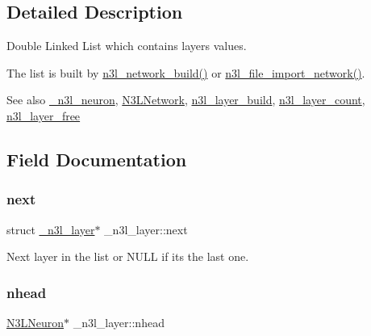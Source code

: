 \subsection{Detailed Description}
Double Linked List which contains layer\textquotesingle{}s values. 

The list is built by \hyperlink{n3__network_8c_a5f87e1efebd658dd55d7d2ca1768bdba}{n3l\+\_\+network\+\_\+build()} or \hyperlink{n3__file_8c_a4fef76548ed87845dceafaa9527a83d0}{n3l\+\_\+file\+\_\+import\+\_\+network()}.

\begin{DoxySeeAlso}{See also}
\hyperlink{struct__n3l__neuron}{\+\_\+n3l\+\_\+neuron}, \hyperlink{structN3LNetwork}{N3\+L\+Network}, \hyperlink{n3__layer_8c_a135215adb7cf8420293fd4ebd7049655}{n3l\+\_\+layer\+\_\+build}, \hyperlink{n3__layer_8c_ab06afb58d55be21a00bde5ee840f6425}{n3l\+\_\+layer\+\_\+count}, \hyperlink{n3__layer_8c_ad58e1630c1b7fc5da03d54cf63c394d9}{n3l\+\_\+layer\+\_\+free} 
\end{DoxySeeAlso}


\subsection{Field Documentation}
\mbox{\label{struct__n3l__layer_afada0fe8b2a403d5aeeb71b0ae7f8aae}} 
\subsubsection{\texorpdfstring{next}{next}}
{\footnotesize\ttfamily struct \hyperlink{struct__n3l__layer}{\+\_\+n3l\+\_\+layer}$\ast$ \+\_\+n3l\+\_\+layer\+::next}

Next layer in the list or N\+U\+LL if it\textquotesingle{}s the last one. \mbox{\label{struct__n3l__layer_a263e7831428a3b535964412a1d802c4e}} 
\subsubsection{\texorpdfstring{nhead}{nhead}}
{\footnotesize\ttfamily \hyperlink{n3__header_8h_a621b1df037f351bd3542298933e5799a}{N3\+L\+Neuron}$\ast$ \+\_\+n3l\+\_\+layer\+::nhead}

